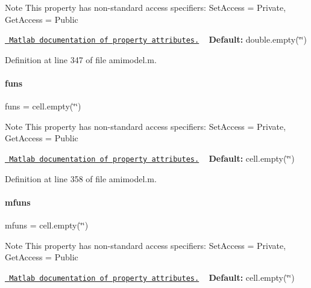 \begin{DoxyNote}{Note}
This property has non-\/standard access specifiers\+: {\ttfamily Set\+Access = Private, Get\+Access = Public} 

\href{http://www.mathworks.com/help/matlab/matlab_oop/property-attributes.html}{\texttt{ Matlab documentation of property attributes.}} ~\newline
{\bfseries{Default\+:}} double.\+empty(\char`\"{}\char`\"{}) 
\end{DoxyNote}


Definition at line 347 of file amimodel.\+m.

\mbox{\label{classamimodel_af80b2560853c3df2b09fef2a198cf5b8}} 
\paragraph{\texorpdfstring{funs}{funs}}
{\footnotesize\ttfamily funs = cell.\+empty(\char`\"{}\char`\"{})}

\begin{DoxyNote}{Note}
This property has non-\/standard access specifiers\+: {\ttfamily Set\+Access = Private, Get\+Access = Public} 

\href{http://www.mathworks.com/help/matlab/matlab_oop/property-attributes.html}{\texttt{ Matlab documentation of property attributes.}} ~\newline
{\bfseries{Default\+:}} cell.\+empty(\char`\"{}\char`\"{}) 
\end{DoxyNote}


Definition at line 358 of file amimodel.\+m.

\mbox{\label{classamimodel_a05ea829e5f102fa401df811ba1614ffb}} 
\paragraph{\texorpdfstring{mfuns}{mfuns}}
{\footnotesize\ttfamily mfuns = cell.\+empty(\char`\"{}\char`\"{})}

\begin{DoxyNote}{Note}
This property has non-\/standard access specifiers\+: {\ttfamily Set\+Access = Private, Get\+Access = Public} 

\href{http://www.mathworks.com/help/matlab/matlab_oop/property-attributes.html}{\texttt{ Matlab documentation of property attributes.}} ~\newline
{\bfseries{Default\+:}} cell.\+empty(\char`\"{}\char`\"{}) 
\end{DoxyNote}



